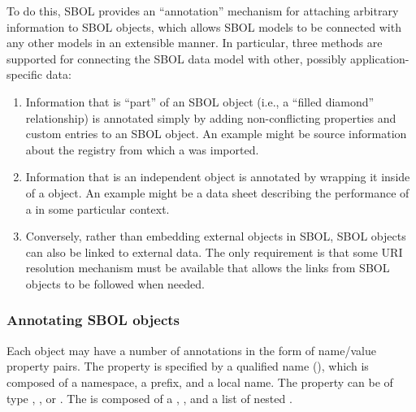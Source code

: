 To do this, SBOL provides an ``annotation'' mechanism for attaching arbitrary information to SBOL objects, which allows SBOL models to be connected with any other models in an extensible manner.
In particular, three methods are supported for connecting the SBOL data model with other, possibly application-specific data:
\begin{enumerate}
\item Information that is ``part'' of an SBOL object (i.e., a ``filled diamond'' relationship) is annotated simply by adding non-conflicting properties and custom entries to an SBOL object.  An example might be source information about the registry from which a  was imported.
\item Information that is an independent object is annotated by wrapping it inside of a  object.  An example might be a data sheet describing the performance of a  in some particular context.
\item Conversely, rather than embedding external objects in SBOL, SBOL objects can also be linked to external data.  The only requirement is that some URI resolution mechanism must be available that allows the links from SBOL objects to be followed when needed.
\end{enumerate}

\subsubsection{Annotating SBOL objects}
\label{sec:value}
\label{sec:Annotation}
\label{sec:AnnotationValue}
\label{sec:ListOfAnnotations}

Each  object may have a number of annotations in the form of name/value property pairs. The  property is specified by a qualified name (), which is composed of a namespace, a prefix, and a local name. The  property can be of type , , or . The  is composed of a , , and a list of nested .


